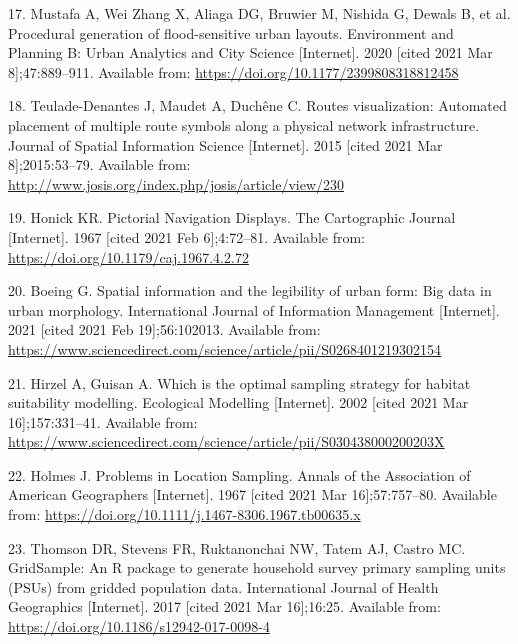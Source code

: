 \documentclass{josis}
\newlength{\cslhangindent}
\newenvironment{CSLReferences}[2] %
 {%
  \setlength{\parindent}{0pt}
  \ifodd #1 \everypar{\setlength{\hangindent}{\cslhangindent}}\ignorespaces\fi
  \ifnum #2 > 0
  \setlength{\parskip}{#2\baselineskip}
  \fi
 }%
 {}
\begin{document}
\begin{CSLReferences}{0}{0}
\leavevmode{}%
17. Mustafa A, Wei Zhang X, Aliaga DG, Bruwier M, Nishida G, Dewals B, et al. Procedural generation of flood-sensitive urban layouts. Environment and Planning B: Urban Analytics and City Science {[}Internet{]}. 2020 {[}cited 2021 Mar 8{]};47:889--911. Available from: \url{https://doi.org/10.1177/2399808318812458}

\leavevmode{}%
18. Teulade-Denantes J, Maudet A, Duchêne C. Routes visualization: {Automated} placement of multiple route symbols along a physical network infrastructure. Journal of Spatial Information Science {[}Internet{]}. 2015 {[}cited 2021 Mar 8{]};2015:53--79. Available from: \url{http://www.josis.org/index.php/josis/article/view/230}

\leavevmode{}%
19. Honick KR. Pictorial {Navigation} {Displays}. The Cartographic Journal {[}Internet{]}. 1967 {[}cited 2021 Feb 6{]};4:72--81. Available from: \url{https://doi.org/10.1179/caj.1967.4.2.72}

\leavevmode{}%
20. Boeing G. Spatial information and the legibility of urban form: {Big} data in urban morphology. International Journal of Information Management {[}Internet{]}. 2021 {[}cited 2021 Feb 19{]};56:102013. Available from: \url{https://www.sciencedirect.com/science/article/pii/S0268401219302154}

\leavevmode{}%
21. Hirzel A, Guisan A. Which is the optimal sampling strategy for habitat suitability modelling. Ecological Modelling {[}Internet{]}. 2002 {[}cited 2021 Mar 16{]};157:331--41. Available from: \url{https://www.sciencedirect.com/science/article/pii/S030438000200203X}

\leavevmode{}%
22. Holmes J. Problems in {Location} {Sampling}. Annals of the Association of American Geographers {[}Internet{]}. 1967 {[}cited 2021 Mar 16{]};57:757--80. Available from: \url{https://doi.org/10.1111/j.1467-8306.1967.tb00635.x}

\leavevmode{}%
23. Thomson DR, Stevens FR, Ruktanonchai NW, Tatem AJ, Castro MC. {GridSample}: An {R} package to generate household survey primary sampling units ({PSUs}) from gridded population data. International Journal of Health Geographics {[}Internet{]}. 2017 {[}cited 2021 Mar 16{]};16:25. Available from: \url{https://doi.org/10.1186/s12942-017-0098-4}


\end{CSLReferences}
\end{document}
